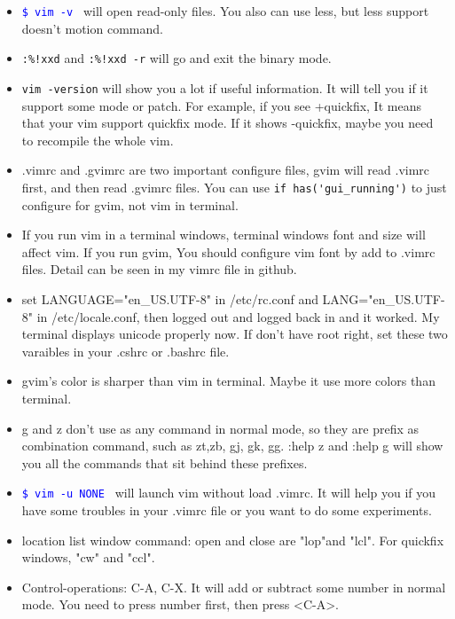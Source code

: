 \documentclass[a4paper,11pt,twoside]{book}
\newcommand{\linuxcommand}[1]{\texttt{\textcolor{blue}{\$ #1 \Pisymbol{psy}{191}}}}
\begin{document}
\begin{itemize}
		\item \linuxcommand{vim -v} will open read-only files. You also can use less, but less support doesn't motion command.

		\item \verb=:%!xxd= and \verb=:%!xxd -r= will go and exit the binary mode.

		\item \verb=vim -version= will show you a lot if useful information. It will tell you if it support some mode or patch. For example, if you see +quickfix, It means that your vim support quickfix mode. If it shows -quickfix, maybe you need to recompile the whole vim.

		\item .vimrc and .gvimrc are two important configure files, gvim  will read .vimrc first, and then read .gvimrc files.  You can use \verb=if has('gui_running')= to just configure for gvim, not vim in terminal. 

		\item If you run vim in a terminal windows, terminal windows font and size will affect vim.  If you run gvim, You should configure vim font by add to .vimrc files. Detail can be seen in my vimrc file in github.

		\item set LANGUAGE="en\_US.UTF-8" in /etc/rc.conf and LANG="en\_US.UTF-8" in /etc/locale.conf, then logged out and logged back in and it worked. My terminal displays unicode properly now. If don't have root right, set these two varaibles in your .cshrc or .bashrc file.

		\item gvim's color is sharper than vim in terminal.  Maybe it use more colors than terminal.  

		\item g and z don't use as any command in normal mode, so they are prefix as combination command, such as zt,zb, gj, gk, gg. :help z and :help g will show you all the commands that sit behind these prefixes.

		\item \linuxcommand{vim -u NONE} will launch vim without load .vimrc. It will help you if you have some troubles in your .vimrc file or you want to do some experiments. 
				
		\item location list window command: open and close are "lop"and "lcl". For quickfix windows, "cw" and "ccl".
		
		\item Control-operations: C-A, C-X. It will add or subtract some number in normal mode. You need to press number first, then press <C-A>.
\end{itemize}
\end{document}
